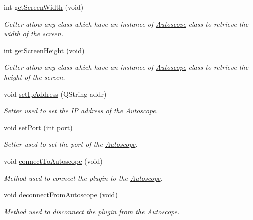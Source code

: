 \begin{DoxyCompactItemize}
int \mbox{\hyperlink{class_autoscope_a0e438a40043c916a7f0f98a30221de11}{get\+Screen\+Width}} (void)
\begin{DoxyCompactList}\small\item\em Getter allow any class which have an instance of \mbox{\hyperlink{class_autoscope}{Autoscope}} class to retrieve the width of the screen. \end{DoxyCompactList}\item 
int \mbox{\hyperlink{class_autoscope_adb579d1e5a23aaa401d5a93be033529d}{get\+Screen\+Height}} (void)
\begin{DoxyCompactList}\small\item\em Getter allow any class which have an instance of \mbox{\hyperlink{class_autoscope}{Autoscope}} class to retrieve the height of the screen. \end{DoxyCompactList}\item 
void \mbox{\hyperlink{class_autoscope_aad5b62b7a114ef8755923067e14f9dd8}{set\+Ip\+Address}} (Q\+String addr)
\begin{DoxyCompactList}\small\item\em Setter used to set the IP address of the \mbox{\hyperlink{class_autoscope}{Autoscope}}. \end{DoxyCompactList}\item 
void \mbox{\hyperlink{class_autoscope_acda88ddee4fb3fbd0333717c0f140e54}{set\+Port}} (int port)
\begin{DoxyCompactList}\small\item\em Setter used to set the port of the \mbox{\hyperlink{class_autoscope}{Autoscope}}. \end{DoxyCompactList}\item 
void \mbox{\hyperlink{class_autoscope_a1ae78f4cada1c4e36f5a06db126017fe}{connect\+To\+Autoscope}} (void)
\begin{DoxyCompactList}\small\item\em Method used to connect the plugin to the \mbox{\hyperlink{class_autoscope}{Autoscope}}. \end{DoxyCompactList}\item 
void \mbox{\hyperlink{class_autoscope_aafe64e11135903a1b83d16ffdd07d63e}{deconnect\+From\+Autoscope}} (void)
\begin{DoxyCompactList}\small\item\em Method used to disconnect the plugin from the \mbox{\hyperlink{class_autoscope}{Autoscope}}. \end{DoxyCompactList}\end{DoxyCompactItemize}
